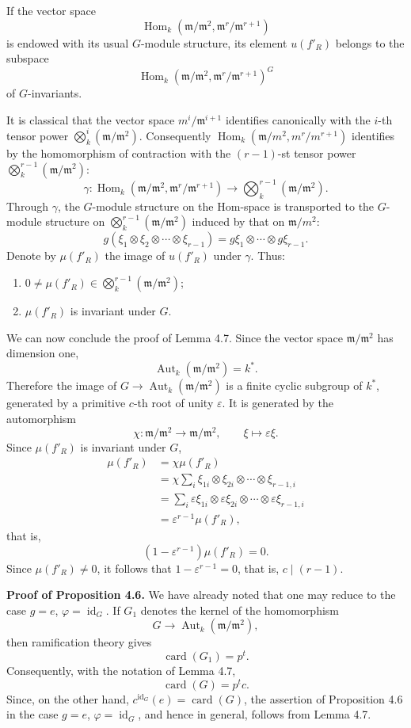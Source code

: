 \documentclass[11pt]{article}
\providecommand{\fm}{\mathfrak{m}}
\DeclareMathOperator{\Hom}{Hom}
\providecommand{\id}{\operatorname{id}}
\providecommand{\Hom}{\operatorname{Hom}}
\providecommand{\id}{\operatorname{id}}
\providecommand{\id}{\operatorname{id}}
\providecommand{\Aut}{\operatorname{Aut}}
\providecommand{\id}{\operatorname{id}}
\providecommand{\id}{\operatorname{id}}
\providecommand{\fm}{\mathfrak m}
\providecommand{\card}{\operatorname{card}}
\providecommand{\Aut}{\operatorname{Aut}}
\providecommand{\Hom}{\operatorname{Hom}}
\providecommand{\id}{\operatorname{id}}
\begin{document}
If the vector space
\[
\Hom_k(\fm/\fm^2,\fm^r/\fm^{r+1})
\]
is endowed with its usual $G$-module structure, its element $u(f'_R)$
belongs to the subspace
\[
\Hom_k(\fm/\fm^2,\fm^r/\fm^{r+1})^G
\]
of $G$-invariants.

It is classical that the vector space $m^i/\fm^{i+1}$ identifies
canonically with the $i$-th tensor power
$\bigotimes_k^i(\fm/\fm^2)$. Consequently
$\Hom_k(\fm/m^2,m^r/m^{r+1})$ identifies by the homomorphism of
contraction with the $(r-1)$-st tensor power
$\bigotimes_k^{r-1}(\fm/\fm^2)$:
\[
\gamma:\Hom_k(\fm/\fm^2,\fm^r/\fm^{r+1})
\longrightarrow\bigotimes_k^{r-1}(\fm/\fm^2).
\]
Through $\gamma$, the $G$-module structure on the Hom-space is
transported to the $G$-module structure on
$\bigotimes_k^{r-1}(\fm/\fm^2)$ induced by that on $\fm/m^2$:
\[
g(\xi_1\otimes\xi_2\otimes\cdots\otimes\xi_{r-1})
=g\xi_1\otimes\cdots\otimes g\xi_{r-1}.
\]
Denote by $\mu(f'_R)$ the image of $u(f'_R)$ under $\gamma$. Thus:
\begin{enumerate}
\item[I)] $0\ne\mu(f'_R)\in\bigotimes_k^{r-1}(\fm/\fm^2)$;
\item[II)] $\mu(f'_R)$ is invariant under $G$.
\end{enumerate}

We can now conclude the proof of Lemma 4.7. Since the vector space
$\fm/\fm^2$ has dimension one,
\[
\Aut_k(\fm/\fm^2)=k^*.
\]
Therefore the image of $G\to\Aut_k(\fm/\fm^2)$ is a finite cyclic
subgroup of $k^*$, generated by a primitive $c$-th root of unity
$\varepsilon$. It is generated by the automorphism
\[
\chi:\fm/\fm^2\longrightarrow\fm/\fm^2,
\qquad \xi\longmapsto\varepsilon\xi.
\]
Since $\mu(f'_R)$ is invariant under $G$,
\[
\begin{aligned}
\mu(f'_R)
&=\chi\mu(f'_R)\\
&=\chi\sum_i\xi_{1i}\otimes\xi_{2i}\otimes\cdots\otimes\xi_{r-1,i}\\
&=\sum_i\varepsilon\xi_{1i}\otimes\varepsilon\xi_{2i}
  \otimes\cdots\otimes\varepsilon\xi_{r-1,i}\\
&=\varepsilon^{r-1}\mu(f'_R),
\end{aligned}
\]
that is,
\[
(1-\varepsilon^{r-1})\mu(f'_R)=0.
\]
Since $\mu(f'_R)\ne0$, it follows that
$1-\varepsilon^{r-1}=0$, that is, $c\mid(r-1)$.

\medskip
\noindent
\textbf{Proof of Proposition 4.6.} We have already noted that one may reduce to the case $g=e$, $\varphi=\id_G$. If $G_1$ denotes the kernel of the homomorphism
\[
G\longrightarrow\Aut_k(\fm/\fm^2),
\]
then ramification theory gives
\[
\card(G_1)=p^t.
\]
Consequently, with the notation of Lemma 4.7,
\[
\card(G)=p^tc.
\]
Since, on the other hand, $c^{\id_G}(e)=\card(G)$, the assertion of Proposition 4.6 in the case $g=e$, $\varphi=\id_G$, and hence in general, follows from Lemma 4.7.
\end{document}
